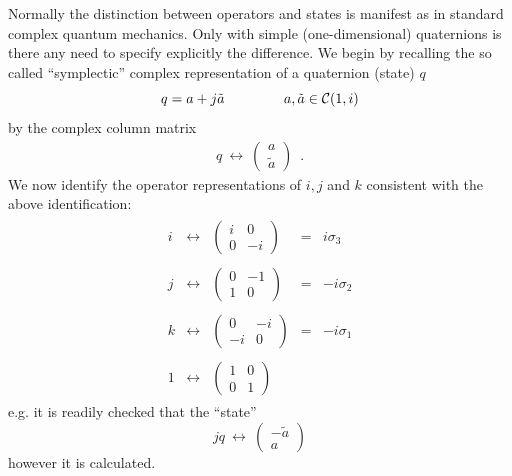 Normally the distinction between operators and states is manifest as in
standard complex quantum mechanics. Only with simple (one-dimensional)
quaternions is there any need to specify explicitly the difference. We
begin by recalling the so called ``symplectic'' complex representation of a
quaternion (state) $q$ \cite{hor}
\begin{equation} \label{b}
q = a + j \tilde{a} \hspace*{15mm} a, \tilde{a} \in {\cal C}(1,i)
\end{equation}
by the complex column matrix
\begin{eqnarray} \label{c}
q \: \leftrightarrow \: \left( \begin{array}{c} a \\
\tilde{a}  \end{array} \right) \; \: .
\end{eqnarray}
We now identify the operator representations of $i, j$ and $k$ consistent
with the above identification:
\begin{eqnarray} \label{d}
\begin{array}{ccccr}
i & \leftrightarrow & \left( \begin{array}{cc} i & 0 \\
0 & -i\end{array} \right) & = & i\sigma_{3} \\ \\
j &  \leftrightarrow &  \left( \begin{array}{cc} 0 & -1 \\
1 & 0\end{array} \right) & = & -i\sigma_{2} \\ \\
k &  \leftrightarrow &  \left( \begin{array}{cc} 0 & -i \\
-i & 0\end{array} \right) & = & -i\sigma_{1} \\ \\
1 & \leftrightarrow & \left( \begin{array}{cc} 1 & 0 \\
0 & 1\end{array} \right) & & \end{array}
\end{eqnarray}
e.g. it is readily checked that the ``state''
\[ jq \: \leftrightarrow \: \left( \begin{array}{c} -\tilde{a} \\
a \end{array} \right) \]
however it is calculated.

